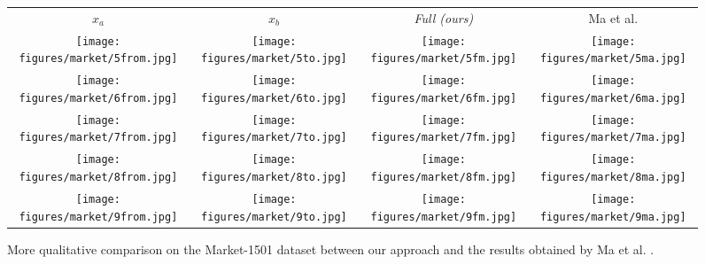 \documentclass[10pt,twocolumn,letterpaper]{article}
\begin{document}
\begin{figure*}[h]
  \centering
  \setlength\tabcolsep{1.0pt}
\begin{tabular}{cccc}
$x_a$ & $x_b$  & \small\emph{Full (ours)}& Ma et al. \cite{ma2017pose}\\ 
\texttt{[image: figures/market/5from.jpg]}
&\texttt{[image: figures/market/5to.jpg]}
&\texttt{[image: figures/market/5fm.jpg]}
&\texttt{[image: figures/market/5ma.jpg]}
\\
\texttt{[image: figures/market/6from.jpg]}
&\texttt{[image: figures/market/6to.jpg]}
&\texttt{[image: figures/market/6fm.jpg]}
&\texttt{[image: figures/market/6ma.jpg]}
\\
\texttt{[image: figures/market/7from.jpg]}
&\texttt{[image: figures/market/7to.jpg]}
&\texttt{[image: figures/market/7fm.jpg]}
&\texttt{[image: figures/market/7ma.jpg]}
\\
\texttt{[image: figures/market/8from.jpg]}
&\texttt{[image: figures/market/8to.jpg]}
&\texttt{[image: figures/market/8fm.jpg]}
&\texttt{[image: figures/market/8ma.jpg]}
\\
\texttt{[image: figures/market/9from.jpg]}
&\texttt{[image: figures/market/9to.jpg]}
&\texttt{[image: figures/market/9fm.jpg]}
&\texttt{[image: figures/market/9ma.jpg]}
\end{tabular}
  \caption{More qualitative comparison on the Market-1501 dataset between our approach and the results obtained by Ma et al. \cite{ma2017pose}.}
\label{fig:comparison-Market-2}
\end{figure*}
\end{document}
